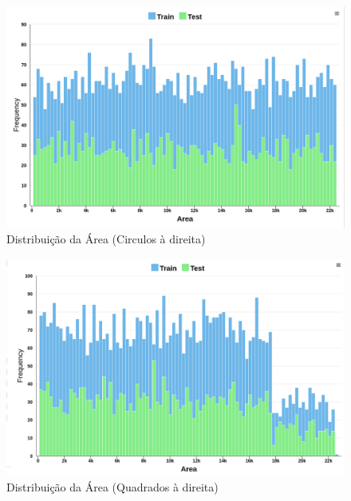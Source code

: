     \begin{figure}[H]
        \centering
        \includegraphics[width=1.0\linewidth]{imgs//Test_7/7_1/dataset/distribution_squares.png}
        \caption{Distribuição da Área (Circulos à direita)}
        \label{fig:enter-label}
    \end{figure}
    \begin{figure}[H]
        \centering
        \includegraphics[width=1.0\linewidth]{imgs//Test_7/7_1/dataset/distribution_circles.png}
        \caption{Distribuição da Área (Quadrados à direita)}
        \label{fig:enter-label}
    \end{figure}
